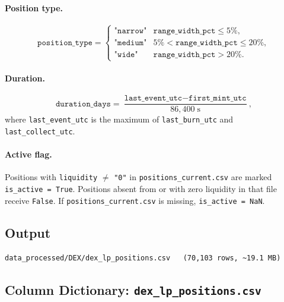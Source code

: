\documentclass[11pt,a4paper]{article}
\begin{document}
\paragraph{Position type.}
\[
  \texttt{position\_type} = \begin{cases}
    \texttt{"narrow"} & \texttt{range\_width\_pct} \leq 5\%, \\
    \texttt{"medium"} & 5\% < \texttt{range\_width\_pct} \leq 20\%, \\
    \texttt{"wide"}   & \texttt{range\_width\_pct} > 20\%.
  \end{cases}
\]

\paragraph{Duration.}
\[
  \texttt{duration\_days} = \frac{\texttt{last\_event\_utc} -
  \texttt{first\_mint\_utc}}{86{,}400\;\mathrm{s}},
\]
where \texttt{last\_event\_utc} is the maximum of \texttt{last\_burn\_utc}
and \texttt{last\_collect\_utc}.

\paragraph{Active flag.}
Positions with \texttt{liquidity} $\neq$ \texttt{"0"} in
\texttt{positions\_current.csv} are marked \texttt{is\_active = True}.
Positions absent from or with zero liquidity in that file receive
\texttt{False}. If \texttt{positions\_current.csv} is missing,
\texttt{is\_active = NaN}.

\subsection{Output}

\begin{lstlisting}
data_processed/DEX/dex_lp_positions.csv   (70,103 rows, ~19.1 MB)
\end{lstlisting}

\subsection{Column Dictionary: \texttt{dex\_lp\_positions.csv}}
\end{document}
